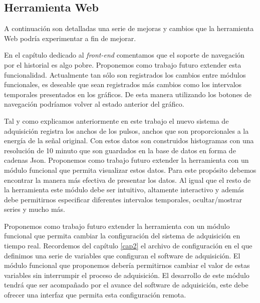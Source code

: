 	\subsection{Herramienta Web}
		A continuación son detalladas una serie de mejoras y cambios que la herramienta Web podría experimentar a fin de mejorar.
		\begin{description}[style=unboxed,leftmargin=0cm,labelwidth=1cm]
			\item[Extender el soporte de navegación por el historial]
				En el capítulo dedicado al \emph{front-end} comentamos que el soporte de navegación por el historial es algo pobre.
				Proponemos como trabajo futuro extender esta funcionalidad. Actualmente tan sólo son registrados los cambios entre
				módulos funcionales, es deseable que sean registrados más cambios como los intervalos temporales presentados en los
				gráficos. De esta manera utilizando los botones de navegación podríamos volver al estado anterior del gráfico.
			\item[Anchos de pulso] 
				Tal y como explicamos anteriormente en este trabajo el nuevo sistema de adquisición registra los anchos de los pulsos,
				anchos que son proporcionales a la energía de la señal original. Con estos datos son construidos histogramas con una
				resolución de 10 minuto que son guardados en la base de datos en forma de cadenas Json. Proponemos como trabajo futuro
				extender la herramienta con un módulo funcional que permita visualizar estos datos. Para este propósito debemos
				encontrar la manera más efectiva de presentar los datos. Al igual que el resto de la herramienta este módulo debe ser
				intuitivo, altamente interactivo y además debe permitirnos especificar diferentes intervalos temporales,
				ocultar/mostrar series y mucho más.
			\item[Configuración del sistema de adquisición]
				Proponemos como trabajo futuro extender la herramienta con un módulo funcional que permita cambiar la configuración
				del sistema de adquisición en tiempo real. Recordemos del capítulo \ref{cap2} el archivo de configuración en el que
				definimos una serie de variables que configuran el software de adquisición. El módulo funcional que proponemos debería
				permitirnos cambiar el valor de estas variables sin interrumpir el proceso de adquisición. El desarrollo de este
				módulo tendrá que ser acompañado por el avance del software de adquisición, este debe ofrecer una interfaz que permita
				esta configuración remota.
			\item[Alarmas y Notificación]

\end{description}
